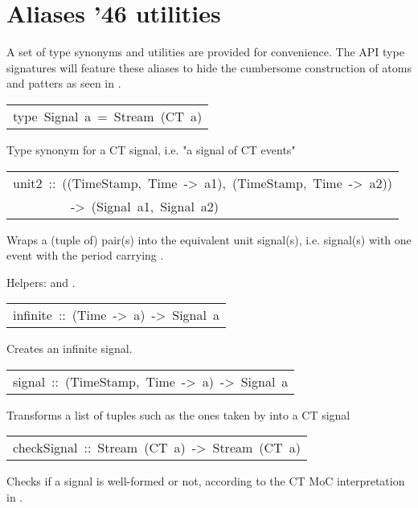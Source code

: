 \section{Aliases {\char '46} utilities}
A set of type synonyms and utilities are provided for
 convenience. The API type signatures will feature these aliases
 to hide the cumbersome construction of atoms and patters as seen
 in .\par

\begin{haddockdesc}
\item[\begin{tabular}{@{}l}
type\ Signal\ a\ =\ Stream\ (CT\ a)
\end{tabular}]\haddockbegindoc
Type synonym for a CT signal, i.e. "a signal of CT events"\par

\end{haddockdesc}
\begin{haddockdesc}
\item[\begin{tabular}{@{}l}
unit2\ ::\ ((TimeStamp,\ Time\ ->\ a1),\ (TimeStamp,\ Time\ ->\ a2))\\\ \ \ \ \ \ \ \ \ ->\ (Signal\ a1,\ Signal\ a2)
\end{tabular}]\haddockbegindoc
Wraps a (tuple of) pair(s)  into the equivalent
 unit signal(s), i.e. signal(s) with one event with the period
  carrying .\par
Helpers:  and .\par

\end{haddockdesc}
\begin{haddockdesc}
\item[\begin{tabular}{@{}l}
infinite\ ::\ (Time\ ->\ a)\ ->\ Signal\ a
\end{tabular}]\haddockbegindoc
Creates an infinite signal.\par

\end{haddockdesc}
\begin{haddockdesc}
\item[\begin{tabular}{@{}l}
signal\ ::\ {\char 91}(TimeStamp,\ Time\ ->\ a){\char 93}\ ->\ Signal\ a
\end{tabular}]\haddockbegindoc
Transforms a list of tuples such as the ones taken by 
 into a CT signal\par

\end{haddockdesc}
\begin{haddockdesc}
\item[\begin{tabular}{@{}l}
checkSignal\ ::\ Stream\ (CT\ a)\ ->\ Stream\ (CT\ a)
\end{tabular}]\haddockbegindoc
Checks if a signal is well-formed or not, according to the CT MoC
 interpretation in .\par

\end{haddockdesc}
